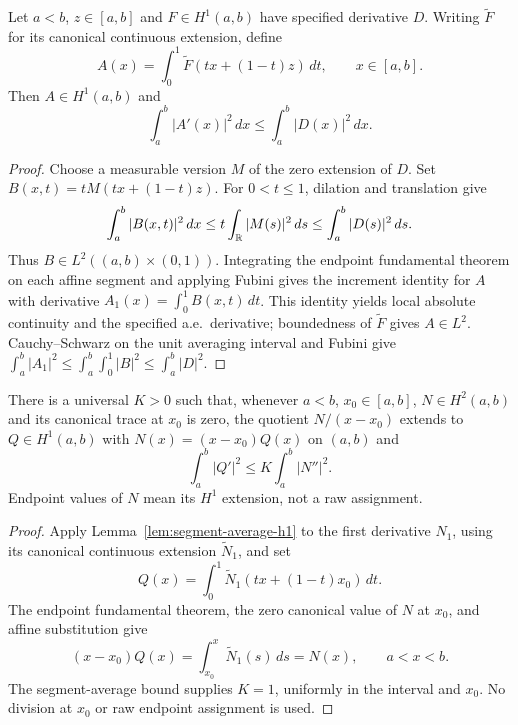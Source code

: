 \begin{lemma}
\label{lem:segment-average-h1}
\leanok
Let $a<b$, $z\in[a,b]$ and $F\in H^1(a,b)$ have specified derivative $D$.
Writing $\widetilde F$ for its canonical continuous extension, define
\[
 A(x)=\int_0^1\widetilde F(tx+(1-t)z)\,dt,\qquad x\in[a,b].
\]
Then $A\in H^1(a,b)$ and
\[
 \int_a^b|A'(x)|^2\,dx\le\int_a^b|D(x)|^2\,dx.
\]
\end{lemma}

\begin{proof}
\leanok
Choose a measurable version $M$ of the zero extension of $D$. Set
$B(x,t)=tM(tx+(1-t)z)$. For $0<t\le1$, dilation and translation give
\[
 \int_a^b|B(x,t)|^2\,dx
 \le t\int_{\mathbb{R}}|M(s)|^2\,ds\le\int_a^b|D(s)|^2\,ds.
\]
Thus $B\in L^2((a,b)\times(0,1))$. Integrating the endpoint fundamental
theorem on each affine segment and applying Fubini gives the increment identity
for $A$ with derivative $A_1(x)=\int_0^1B(x,t)\,dt$.
This identity yields local absolute continuity and the specified a.e.\ derivative;
boundedness of $\widetilde F$ gives $A\in L^2$.
Cauchy--Schwarz on the unit averaging interval and Fubini give
$\int_a^b|A_1|^2\le\int_a^b\int_0^1|B|^2\le\int_a^b|D|^2$.
\end{proof}

\begin{lemma}
\label{lem:hardy-second}
\leanok
There is a universal $K>0$ such that, whenever $a<b$, $x_0\in[a,b]$,
$N\in H^2(a,b)$ and its canonical trace at $x_0$ is zero, the quotient
$N/(x-x_0)$ extends to $Q\in H^1(a,b)$ with
$N(x)=(x-x_0)Q(x)$ on $(a,b)$ and
\[
 \int_a^b|Q'|^2\le K\int_a^b|N''|^2.
\]
Endpoint values of $N$ mean its $H^1$ extension, not a raw assignment.
\end{lemma}

\begin{proof}
\leanok
Apply Lemma~\ref{lem:segment-average-h1} to the first derivative $N_1$,
using its canonical continuous extension $\widetilde N_1$, and set
\[
 Q(x)=\int_0^1\widetilde N_1(tx+(1-t)x_0)\,dt.
\]
The endpoint fundamental theorem, the zero canonical value of $N$ at $x_0$,
and affine substitution give
\[
 (x-x_0)Q(x)=\int_{x_0}^x\widetilde N_1(s)\,ds=N(x),\qquad a<x<b.
\]
The segment-average bound supplies $K=1$, uniformly in the interval and $x_0$.
No division at $x_0$ or raw endpoint assignment is used.
\end{proof}

